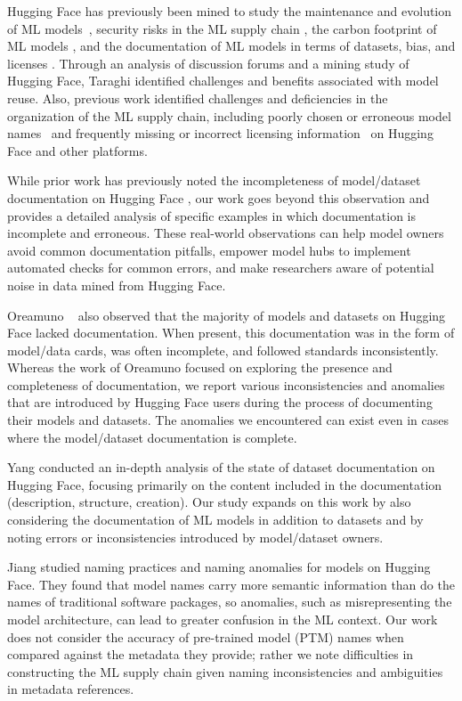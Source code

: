 Hugging Face has previously been mined to study the maintenance and evolution of ML models~\cite{castano2024analyzing}, security risks in the ML supply chain \cite{jiang2022empirical}, the carbon footprint of ML models \cite{castano2023exploring}, and the documentation of ML models in terms of datasets, bias, and licenses \cite{pepe2024hugging}. Through an analysis of discussion forums and a mining study of Hugging Face, Taraghi \etal \cite{taraghi2024deep} %
identified challenges and benefits associated with model reuse. Also, previous work identified challenges and deficiencies in the organization of the ML supply chain, including poorly chosen or erroneous model names~\cite{jiang2023exploring} and frequently missing or incorrect licensing information~\cite{longpre2023data} on Hugging Face and other platforms. 

While prior work has previously noted the incompleteness of model/dataset documentation on Hugging Face \cite{Jiang2023AnES, pepe2024hugging, yang2024navigating}, our work goes beyond this observation and provides a detailed analysis of specific examples in which documentation is incomplete and erroneous.  These real-world observations can help model owners avoid common documentation pitfalls, empower model hubs to implement automated checks for common errors, and make researchers aware of potential noise in data mined from Hugging Face.

Oreamuno \etal~\cite{oreamuno2024state} also observed that the majority of models and datasets on Hugging Face lacked documentation. When present, this documentation was in the form of model/data cards, was often incomplete, and followed standards inconsistently.  Whereas the work of Oreamuno \etal focused on exploring the presence and completeness of documentation, we report various inconsistencies and anomalies that are introduced by Hugging Face users during the process of documenting their models and datasets.  The anomalies we encountered can exist even in cases where the model/dataset documentation is complete. %

Yang \etal \cite{yang2024navigating} conducted an in-depth analysis of the state of dataset documentation on Hugging Face, focusing primarily on the content included in the documentation (\eg description, structure, creation).  Our study expands on this work by also considering the documentation of ML models in addition to datasets and by noting errors or inconsistencies introduced by model/dataset owners.

Jiang \etal \cite{jiang2024naming} studied naming practices and naming anomalies for models on Hugging Face.  They found that model names carry more semantic information than do the names of traditional software packages, so anomalies, such as misrepresenting the model architecture, can lead to greater confusion in the ML context.  %
Our work does not consider the accuracy of pre-trained model (PTM) names when compared against the metadata they provide; rather we note difficulties in constructing the ML supply chain given naming inconsistencies and ambiguities in metadata references. %

